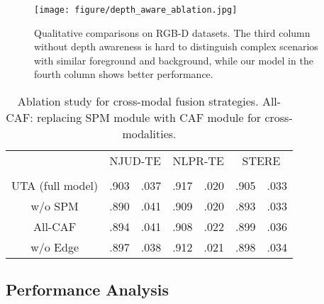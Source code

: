 \documentclass[journal]{IEEEtran}
\begin{document}
\linespread{1}















\begin{figure}[t]
	\begin{center}
\texttt{[image: figure/depth\_aware\_ablation.jpg]}
		\caption{Qualitative comparisons on RGB-D datasets. The third column without depth awareness is hard to distinguish complex scenarios with similar foreground and background, while our model in the fourth column shows better performance.
		}\label{fig:analysis}
	\end{center}
\end{figure}






\linespread{1.3}
\begin{table}[t]
    \caption{Ablation study for cross-modal fusion strategies. All-CAF: replacing SPM module with CAF module for cross-modalities. }
\label{table: SPM ablation}
\begin{center}
\renewcommand\tabcolsep{3.0pt}
\begin{tabular}{c|cc|cc|cc}
\hline
\multirow{2}{*}{} & \multicolumn{2}{c|}{NJUD-TE} & \multicolumn{2}{c|}{NLPR-TE} & \multicolumn{2}{c}{STERE}  \\
         &  &  &  &  &  &  \\ \hline
UTA (full model)     & .903 & .037 & .917 & .020 & .905 & .033  \\
w/o SPM  & .890 & .041 & .909 & .020 & .893 & .033  \\
All-CAF     & .894 & .041 & .908 & .022 & .899 & .036  \\
w/o Edge & .897 & .038 & .912 & .021 & .898 & .034  \\\hline
\end{tabular}
\end{center}
\end{table}
\linespread{1}








\subsection{Performance Analysis}
\end{document}
